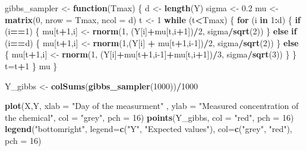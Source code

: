 \documentclass[]{article}
\newenvironment{Shaded}{\begin{snugshade}}{\end{snugshade}}
\newcommand{\ControlFlowTok}[1]{\textcolor[rgb]{0.13,0.29,0.53}{\textbf{#1}}}
\newcommand{\DataTypeTok}[1]{\textcolor[rgb]{0.13,0.29,0.53}{#1}}
\newcommand{\DecValTok}[1]{\textcolor[rgb]{0.00,0.00,0.81}{#1}}
\newcommand{\FloatTok}[1]{\textcolor[rgb]{0.00,0.00,0.81}{#1}}
\newcommand{\KeywordTok}[1]{\textcolor[rgb]{0.13,0.29,0.53}{\textbf{#1}}}
\newcommand{\NormalTok}[1]{#1}
\newcommand{\OperatorTok}[1]{\textcolor[rgb]{0.81,0.36,0.00}{\textbf{#1}}}
\newcommand{\StringTok}[1]{\textcolor[rgb]{0.31,0.60,0.02}{#1}}
\begin{document}
\begin{Shaded}
\begin{Highlighting}[]
\NormalTok{gibbs_sampler <-}\StringTok{ }\ControlFlowTok{function}\NormalTok{(Tmax) \{}
\NormalTok{  d <-}\StringTok{ }\KeywordTok{length}\NormalTok{(Y)}
\NormalTok{  sigma <-}\StringTok{ }\FloatTok{0.2}
\NormalTok{  mu <-}\StringTok{ }\KeywordTok{matrix}\NormalTok{(}\DecValTok{0}\NormalTok{, }\DataTypeTok{nrow =}\NormalTok{ Tmax, }\DataTypeTok{ncol =}\NormalTok{ d)}
\NormalTok{  t <-}\StringTok{ }\DecValTok{1}
  \ControlFlowTok{while}\NormalTok{ (t}\OperatorTok{<}\NormalTok{Tmax) \{}
    \ControlFlowTok{for}\NormalTok{ (i }\ControlFlowTok{in} \DecValTok{1}\OperatorTok{:}\NormalTok{d) \{}
      \ControlFlowTok{if}\NormalTok{ (i}\OperatorTok{==}\DecValTok{1}\NormalTok{) \{}
\NormalTok{        mu[t}\OperatorTok{+}\DecValTok{1}\NormalTok{,i] <-}\StringTok{ }\KeywordTok{rnorm}\NormalTok{(}\DecValTok{1}\NormalTok{, (Y[i]}\OperatorTok{+}\NormalTok{mu[t,i}\OperatorTok{+}\DecValTok{1}\NormalTok{])}\OperatorTok{/}\DecValTok{2}\NormalTok{, sigma}\OperatorTok{/}\KeywordTok{sqrt}\NormalTok{(}\DecValTok{2}\NormalTok{))}
\NormalTok{      \}}
      \ControlFlowTok{else} \ControlFlowTok{if}\NormalTok{ (i}\OperatorTok{==}\NormalTok{d) \{}
\NormalTok{        mu[t}\OperatorTok{+}\DecValTok{1}\NormalTok{,i] <-}\StringTok{ }\KeywordTok{rnorm}\NormalTok{(}\DecValTok{1}\NormalTok{,(Y[i] }\OperatorTok{+}\StringTok{ }\NormalTok{mu[t}\OperatorTok{+}\DecValTok{1}\NormalTok{,i}\DecValTok{-1}\NormalTok{])}\OperatorTok{/}\DecValTok{2}\NormalTok{, sigma}\OperatorTok{/}\KeywordTok{sqrt}\NormalTok{(}\DecValTok{2}\NormalTok{))}
\NormalTok{      \}}
      \ControlFlowTok{else}\NormalTok{ \{}
\NormalTok{        mu[t}\OperatorTok{+}\DecValTok{1}\NormalTok{,i] <-}\StringTok{ }\KeywordTok{rnorm}\NormalTok{(}\DecValTok{1}\NormalTok{, (Y[i]}\OperatorTok{+}\NormalTok{mu[t}\OperatorTok{+}\DecValTok{1}\NormalTok{,i}\DecValTok{-1}\NormalTok{]}\OperatorTok{+}\NormalTok{mu[t,i}\OperatorTok{+}\DecValTok{1}\NormalTok{])}\OperatorTok{/}\DecValTok{3}\NormalTok{, sigma}\OperatorTok{/}\KeywordTok{sqrt}\NormalTok{(}\DecValTok{3}\NormalTok{))}
\NormalTok{      \}}
\NormalTok{    \}}
\NormalTok{    t=t}\OperatorTok{+}\DecValTok{1}
\NormalTok{  \}}
\NormalTok{  mu}
\NormalTok{\}}

\NormalTok{Y_gibbs <-}\StringTok{ }\KeywordTok{colSums}\NormalTok{(}\KeywordTok{gibbs_sampler}\NormalTok{(}\DecValTok{1000}\NormalTok{))}\OperatorTok{/}\DecValTok{1000}


\KeywordTok{plot}\NormalTok{(X,Y, }\DataTypeTok{xlab =} \StringTok{"Day of the measurment"}
\NormalTok{     , }\DataTypeTok{ylab =} \StringTok{"Measured concentration of the chemical"}\NormalTok{, }\DataTypeTok{col =} \StringTok{"grey"}\NormalTok{, }\DataTypeTok{pch =} \DecValTok{16}\NormalTok{)}
\KeywordTok{points}\NormalTok{(Y_gibbs, }\DataTypeTok{col =} \StringTok{"red"}\NormalTok{, }\DataTypeTok{pch =} \DecValTok{16}\NormalTok{)}
\KeywordTok{legend}\NormalTok{(}\StringTok{"bottomright"}\NormalTok{, }\DataTypeTok{legend=}\KeywordTok{c}\NormalTok{(}\StringTok{"Y"}\NormalTok{, }\StringTok{"Expected values"}\NormalTok{), }\DataTypeTok{col=}\KeywordTok{c}\NormalTok{(}\StringTok{"grey"}\NormalTok{, }\StringTok{"red"}\NormalTok{), }\DataTypeTok{pch =} \DecValTok{16}\NormalTok{)}


\end{Highlighting}
\end{Shaded}
\end{document}
